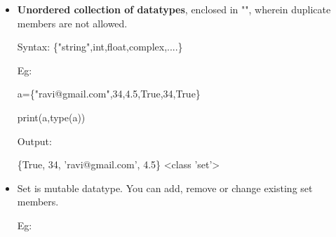 

\begin{flushleft}

	\begin{itemize}

		\item \textbf{Unordered collection of datatypes}, enclosed in "{}", wherein duplicate members are not allowed.

		\begin{tcolorbox}[breakable,notitle,boxrule=1pt,colback=pink,colframe=pink]

			\color{black}

			\font=8pt

			Syntax: \{"string",int,float,complex,....\}

			\font=4pt

		\end{tcolorbox}

		
		Eg:	

		\begin{tcolorbox}[breakable,notitle,boxrule=-0pt,colback=code,colframe=code]

			\color{white}

			\font=8pt

			a=\{"ravi@gmail.com",34,4.5,True,34,True\}

			\newline

			print(a,type(a))

			\font=4pt

		\end{tcolorbox}

		
		Output:

		\begin{tcolorbox}[breakable,notitle,boxrule=-0pt,colback=output,colframe=output]

			\color{black}

			\{True, 34, 'ravi@gmail.com', 4.5\} <class 'set'>

			\font=4pt

		\end{tcolorbox}

		
		\bigskip

		
		\item Set is mutable datatype. You can add, remove or change existing set members.

		\newline
		Eg:
		\begin{tcolorbox}[breakable,notitle,boxrule=-0pt,colback=code,colframe=code]


\end{tcolorbox}
\end{itemize}
\end{flushleft}
